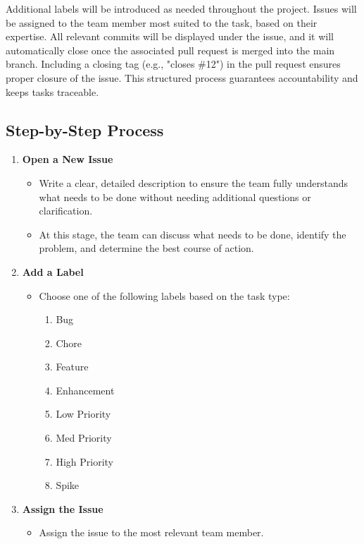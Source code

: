 \documentclass{article}
\begin{document}
Additional labels will be introduced as needed throughout the project. Issues will be 
assigned to the team member most suited to the task, based on their expertise. All 
relevant commits will be displayed under the issue, and it will automatically close once 
the associated pull request is merged into the main branch. Including a closing tag (e.g., "closes \#12") 
in the pull request ensures proper closure of the issue. This structured process guarantees 
accountability and keeps tasks traceable.

\subsection*{Step-by-Step Process}

\begin{enumerate}
    \item \textbf{Open a New Issue}
    \begin{itemize}
        \item Write a clear, detailed description to ensure the team fully understands what needs to 
        be done without needing additional questions or clarification.
        \item At this stage, the team can discuss what needs to be done, identify the problem, 
        and determine the best course of action.
    \end{itemize}

    \item \textbf{Add a Label}
    \begin{itemize}
        \item Choose one of the following labels based on the task type:
        \begin{enumerate}
            \item Bug
            \item Chore
            \item Feature
            \item Enhancement
            \item Low Priority
            \item Med Priority
            \item High Priority
            \item Spike
        \end{enumerate}
    \end{itemize}

    \item \textbf{Assign the Issue}
    \begin{itemize}
        \item Assign the issue to the most relevant team member.
    \end{itemize}
\end{enumerate}
\end{document}
